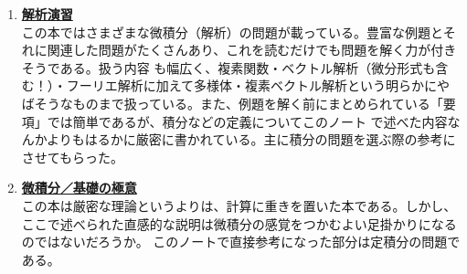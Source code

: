 \documentclass[a4j,dvipdfmx]{jsarticle}
\begin{document}
\begin{enumerate}
            \item \href{https://www.utp.or.jp/book/b302122.html}{\textbf{解析演習}}\\この本ではさまざまな微積分（解析）の問題が載っている。豊富な例題とそれに関連した問題がたくさんあり、これを読むだけでも問題を解く力が付きそうである。扱う内容
            も幅広く、複素関数・ベクトル解析（微分形式も含む！）・フーリエ解析に加えて多様体・複素ベクトル解析という明らかにやばそうなものまで扱っている。また、例題を解く前にまとめられている「要項」では簡単であるが、積分などの定義についてこのノート
            で述べた内容なんかよりもはるかに厳密に書かれている。主に積分の問題を選ぶ際の参考にさせてもらった。
            \item \href{https://ts-webstore.net/?pid=120253578}{\textbf{微積分／基礎の極意}}\\この本は厳密な理論というよりは、計算に重きを置いた本である。しかし、ここで述べられた直感的な説明は微積分の感覚をつかむよい足掛かりになるのではないだろうか。
            このノートで直接参考になった部分は定積分の問題である。
        \end{enumerate}
    \clearpage
\end{document}
